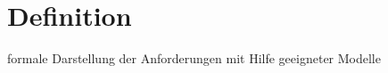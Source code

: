 \section{Definition}

formale Darstellung der Anforderungen mit Hilfe geeigneter Modelle

\pagebreak